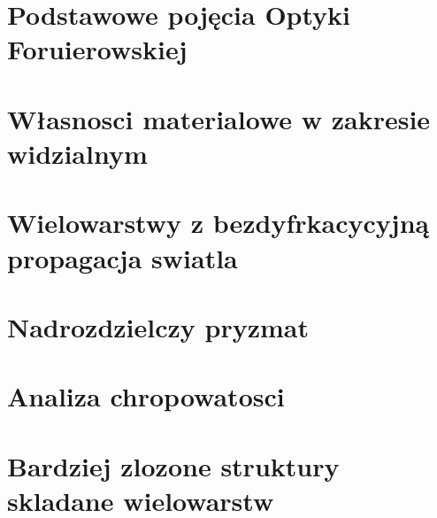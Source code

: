 
\section{Podstawowe pojęcia Optyki Foruierowskiej}
\section{Własnosci materialowe w zakresie widzialnym}

\section{Wielowarstwy z bezdyfrkacycyjną propagacja swiatla}
\section{Nadrozdzielczy pryzmat}
\section{Analiza chropowatosci}
\section{Bardziej zlozone struktury skladane wielowarstw}





